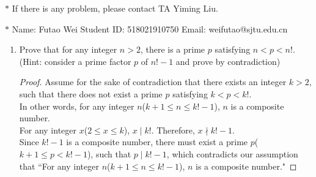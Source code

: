 \documentclass[12pt,a4paper]{article}
\theoremstyle{definition}
\begin{document}
	\noindent
	
	\noindent{}
	\begin{center}
		\footnotesize{\color{red}$*$ If there is any problem, please contact TA Yiming Liu.}
		
		\footnotesize{\color{blue}$*$ Name: Futao Wei  \quad Student ID: 518021910750 \quad Email: weifutao@sjtu.edu.cn}
	\end{center}
	
	\begin{enumerate}
	    \item
	    Prove that for any integer $n>2$, there is a prime $p$ satisfying $n<p<n!$. {\color{blue}(Hint: consider a prime factor $p$ of $n!-1$ and prove by contradiction)}
	    \begin{proof}
			\hfill \break
			Assume for the sake of contradiction that there exists an integer $k > 2$, such that there does not exist a prime $p$ satisfying $k < p < k!$. \\
			In other words, for any integer $n$($k + 1 \leq n \leq k! - 1$), $n$ is a composite number. \\
			For any integer $x$($2 \leq x \leq k$), $x \mid k!$. Therefore, $x \nmid k! - 1$. \\
			Since $k! - 1$ is a composite number, there must exist a prime $p$($k + 1 \leq p < k! - 1$), such that $p \mid k! - 1$, which contradicts our assumption that ``For any integer $n$($k + 1 \leq n \leq k! - 1$), $n$ is a composite number." 
	    	
        \end{proof}
	

\end{enumerate}
\end{document}
